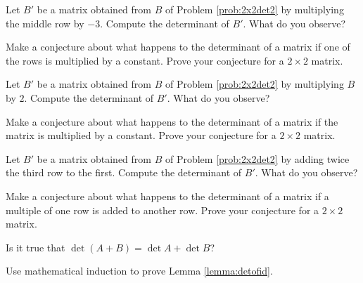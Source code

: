 \documentclass{ximera}
\begin{document}
\begin{problem}\label{prob:scalarmultrowdet} Let $B'$ be a matrix obtained from $B$ of Problem \ref{prob:2x2det2} by multiplying the middle row by $-3$.  Compute the determinant of $B'$.  What do you observe?
\end{problem}

\begin{problem}\label{prob:rowtimesconstant2x2proof}
Make a conjecture about what happens to the determinant of a matrix if one of the rows is multiplied by a constant.  Prove your conjecture for a $2\times 2$ matrix.
\end{problem}

\begin{problem}\label{prob:matrixtimesconst}
Let $B'$ be a matrix obtained from $B$ of Problem \ref{prob:2x2det2} by multiplying $B$ by $2$.  Compute the determinant of $B'$.  What do you observe?
\end{problem}

\begin{problem}\label{prob:matrixtimesconstant2x2proof}
Make a conjecture about what happens to the determinant of a matrix if the matrix is multiplied by a constant.  Prove your conjecture for a $2\times 2$ matrix.
\end{problem}

\begin{problem}\label{prob:scalarmultofrow}
Let $B'$ be a matrix obtained from $B$ of Problem \ref{prob:2x2det2} by adding twice the third row to the first.  Compute the determinant of $B'$.  What do you observe?
\end{problem}

\begin{problem}\label{prob:scalarmultofrow2x2}
Make a conjecture about what happens to the determinant of a matrix if a multiple of one row is added to another row.  Prove your conjecture for a $2\times 2$ matrix.
\end{problem}

\begin{problem}\label{prob:detsumsumdetquestion}
Is it true that 
$\det{(A+B)}=\det{A}+\det{B}$?
\end{problem}

\begin{problem}\label{prob:detIproof}
Use mathematical induction to prove Lemma \ref{lemma:detofid}.
\end{problem}
\end{document}
